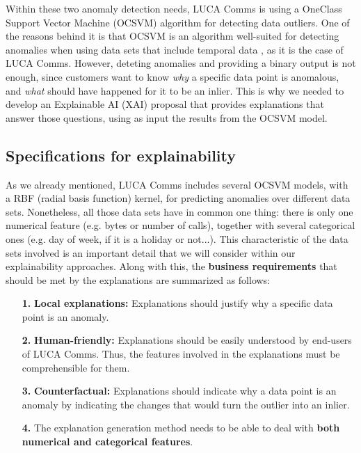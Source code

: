 Within these two anomaly detection needs, LUCA Comms is using a OneClass Support Vector Machine (OCSVM) algorithm for detecting data outliers. One of the reasons behind it is that OCSVM is an algorithm well-suited for detecting anomalies when using data sets that include temporal data \parencite{ma2003time}, as it is the case of LUCA Comms. However, deteting anomalies and providing a binary output is not enough, since customers want to know \textit{why} a specific data point is anomalous, and \textit{what} should have happened for it to be an inlier. This is why we needed to develop an Explainable AI (XAI) proposal that provides explanations that answer those questions, using as input the results from the OCSVM model.

\subsection{Specifications for explainability}\label{subsec:ch5-XAI-requirements-Comms}
As we already mentioned, LUCA Comms includes several OCSVM models, with a RBF (radial basis function) kernel, for predicting anomalies over different data sets. Nonetheless, all those data sets have in common one thing: there is only one numerical feature (e.g. bytes or number of calls), together with several categorical ones (e.g. day of week, if it is a holiday or not...). This characteristic of the data sets involved is an important detail that we will consider within our explainability approaches.
Along with this, the \textbf{business requirements} that should be met by the explanations are summarized as follows:
\begin{itemize}
    \item[\textbf{1.}] \textbf{Local explanations:} Explanations should justify why a specific data point is an anomaly.
    \item[\textbf{2.}] \textbf{Human-friendly:} Explanations should be easily understood by end-users of LUCA Comms. Thus, the features involved in the explanations must be comprehensible for them.
    \item[\textbf{3.}] \textbf{Counterfactual:} Explanations should indicate why a data point is an anomaly by indicating the changes that would turn the outlier into an inlier.
    \item[\textbf{4.}] The explanation generation method needs to be able to deal with \textbf{both numerical and categorical features}. %
\end{itemize}

